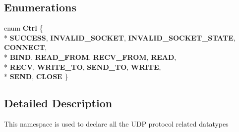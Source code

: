 \subsection*{Enumerations}
\begin{DoxyCompactItemize}
\item 
enum {\bfseries Ctrl} \{ \\*
{\bfseries S\+U\+C\+C\+E\+SS}, 
{\bfseries I\+N\+V\+A\+L\+I\+D\+\_\+\+S\+O\+C\+K\+ET}, 
{\bfseries I\+N\+V\+A\+L\+I\+D\+\_\+\+S\+O\+C\+K\+E\+T\+\_\+\+S\+T\+A\+TE}, 
{\bfseries C\+O\+N\+N\+E\+CT}, 
\\*
{\bfseries B\+I\+ND}, 
{\bfseries R\+E\+A\+D\+\_\+\+F\+R\+OM}, 
{\bfseries R\+E\+C\+V\+\_\+\+F\+R\+OM}, 
{\bfseries R\+E\+AD}, 
\\*
{\bfseries R\+E\+CV}, 
{\bfseries W\+R\+I\+T\+E\+\_\+\+TO}, 
{\bfseries S\+E\+N\+D\+\_\+\+TO}, 
{\bfseries W\+R\+I\+TE}, 
\\*
{\bfseries S\+E\+ND}, 
{\bfseries C\+L\+O\+SE}
 \}\hypertarget{namespaceudp_ad6d7a8c9a623461da646a1d4f44ecfa2}{}\label{namespaceudp_ad6d7a8c9a623461da646a1d4f44ecfa2}

\end{DoxyCompactItemize}


\subsection{Detailed Description}
This namespace is used to declare all the U\+DP protocol related datatypes 